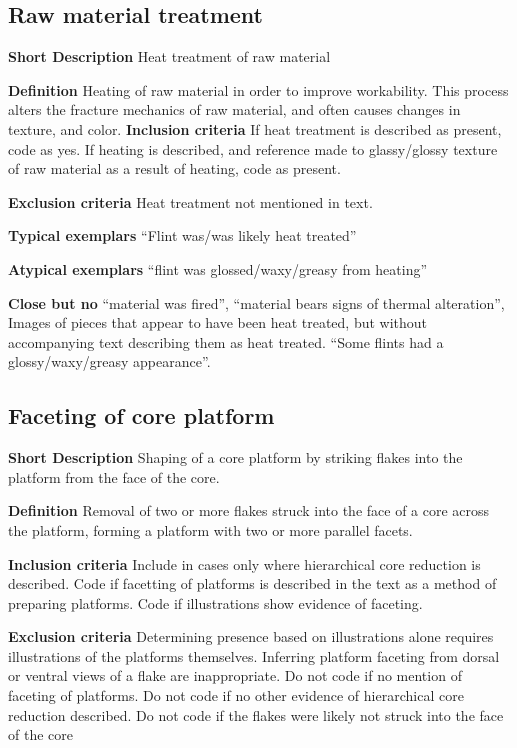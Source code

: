 \documentclass[
]{article}
\begin{document}
\hypertarget{raw-material-treatment}{%
\subsection{Raw material treatment}\label{raw-material-treatment}}

\textbf{Short Description} Heat treatment of raw material

\textbf{Definition} Heating of raw material in order to improve
workability. This process alters the fracture mechanics of raw material,
and often causes changes in texture, and color. \textbf{Inclusion
criteria} If heat treatment is described as present, code as yes. If
heating is described, and reference made to glassy/glossy texture of raw
material as a result of heating, code as present.

\textbf{Exclusion criteria} Heat treatment not mentioned in text.

\textbf{Typical exemplars} ``Flint was/was likely heat treated''

\textbf{Atypical exemplars} ``flint was glossed/waxy/greasy from
heating''

\textbf{Close but no} ``material was fired'', ``material bears signs of
thermal alteration'', Images of pieces that appear to have been heat
treated, but without accompanying text describing them as heat treated.
``Some flints had a glossy/waxy/greasy appearance''.

\hypertarget{faceting-of-core-platform}{%
\subsection{Faceting of core platform}\label{faceting-of-core-platform}}

\textbf{Short Description} Shaping of a core platform by striking flakes
into the platform from the face of the core.

\textbf{Definition} Removal of two or more flakes struck into the face
of a core across the platform, forming a platform with two or more
parallel facets.

\textbf{Inclusion criteria} Include in cases only where hierarchical
core reduction is described. Code if facetting of platforms is described
in the text as a method of preparing platforms. Code if illustrations
show evidence of faceting.

\textbf{Exclusion criteria} Determining presence based on illustrations
alone requires illustrations of the platforms themselves. Inferring
platform faceting from dorsal or ventral views of a flake are
inappropriate. Do not code if no mention of faceting of platforms. Do
not code if no other evidence of hierarchical core reduction described.
Do not code if the flakes were likely not struck into the face of the
core
\end{document}
